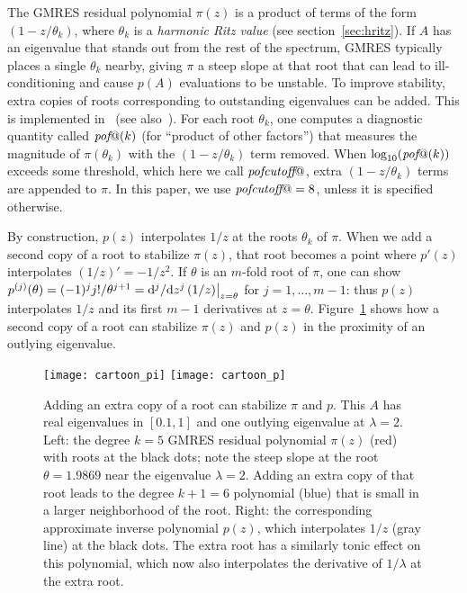 \documentclass{siamart}
\makeatletter
\def\pof{\mbox{{\it pof}}@}
\def\pofcutoff{\mbox{{\it pofcutoff}}@}
\makeatother
\begin{document}
The GMRES residual polynomial $\pi(z)$ is a product of terms of the form $(1-z/\theta_k)$, where $\theta_k$ is a \emph{harmonic Ritz value} (see section~\ref{sec:hritz}).
If $A$ has an eigenvalue that stands out from the rest of the spectrum, GMRES typically places a single $\theta_k$ nearby, giving $\pi$ a steep slope at that root that can lead to ill-conditioning and cause $p(A)$ evaluations to be unstable.  To improve stability, extra copies of roots corresponding to outstanding eigenvalues can be added.
This is implemented in~\cite[p.~A21]{PPArn} (see also~\cite[alg.~2]{PPGStable}).  For each root $\theta_k$, one computes a diagnostic quantity called $\pof(k)$ (for ``product of other factors'') that measures the magnitude of $\pi(\theta_k)$ with the $(1-z/\theta_k)$ term removed.  When $\log_{10}(\pof(k))$ exceeds some threshold, which here we call $\pofcutoff$, extra $(1-z/\theta_k)$ terms are appended to $\pi$.  In this paper, we use $\pofcutoff=8$, unless it is specified otherwise. 

By construction, $p(z)$ interpolates $1/z$ at the roots $\theta_k$ of $\pi$.
When we add a second copy of a root to stabilize $\pi(z)$, that root becomes a point where $p'(z)$ interpolates $(1/z)' = -1/z^2$.  If $\theta$ is an $m$-fold root of $\pi$,  one can show  
$p^{(j)}(\theta) = (-1)^j j!/\theta^{j+1} = {\rm d}^j/{\rm d}z^j\,(1/z) \big|_{z=\theta}$ for $j=1,\ldots, m-1$: thus $p(z)$ interpolates $1/z$ and its first $m-1$ derivatives at $z=\theta$.  
Figure~\ref{fig:cartoon} shows how a second copy of a root can stabilize $\pi(z)$ and $p(z)$ in the proximity of an outlying eigenvalue.


\begin{figure}[b!]
\begin{center}
\texttt{[image: cartoon\_pi]} \qquad
\texttt{[image: cartoon\_p]} 
\end{center}

\vspace*{-7pt}
\caption{\label{fig:cartoon}
Adding an extra copy of a root can stabilize $\pi$ and $p$.
This $A$ has real eigenvalues in $[0.1,1]$ and one outlying eigenvalue at $\lambda=2$.
Left: the degree $k=5$ GMRES residual polynomial $\pi(z)$ (red) with roots at the black dots; note the steep slope at the root $\theta = 1.9869$ near the eigenvalue $\lambda=2$.  Adding an extra copy of that root leads to the degree $k+1=6$ polynomial (blue) that is small in a larger neighborhood of the root.
Right: the corresponding approximate inverse polynomial $p(z)$, which interpolates $1/z$ (gray line) at the black dots.  The extra root has a similarly tonic effect on this polynomial, which now also interpolates the derivative of $1/\lambda$ at the extra root.
}
\end{figure}
\end{document}
